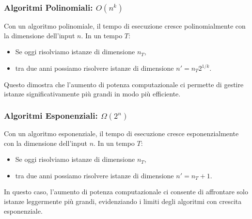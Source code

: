 \subsubsection*{Algoritmi Polinomiali: \(O(n^k)\)}
Con un algoritmo polinomiale, il tempo di esecuzione cresce polinomialmente con la
dimensione dell'input \(n\). In un tempo \(T\):
\begin{itemize}
    \item Se oggi risolviamo istanze di dimensione \(n_T\),
    \item tra due anni possiamo risolvere istanze di dimensione \(n' = n_T 2^{1/k}\).
\end{itemize}
Questo dimostra che l'aumento di potenza computazionale ci permette di gestire istanze
significativamente più grandi in modo più efficiente.
    
\subsubsection{Algoritmi Esponenziali: \(\Omega(2^n)\)}
Con un algoritmo esponenziale, il tempo di esecuzione cresce esponenzialmente con la dimensione
dell'input \(n\). In un tempo \(T\):
\begin{itemize}
    \item Se oggi risolviamo istanze di dimensione \(n_T\),
    \item tra due anni possiamo risolvere istanze di dimensione \(n' = n_T + 1\).
\end{itemize}
In questo caso, l'aumento di potenza computazionale ci consente di affrontare solo istanze
leggermente più grandi, evidenziando i limiti degli algoritmi con crescita esponenziale.